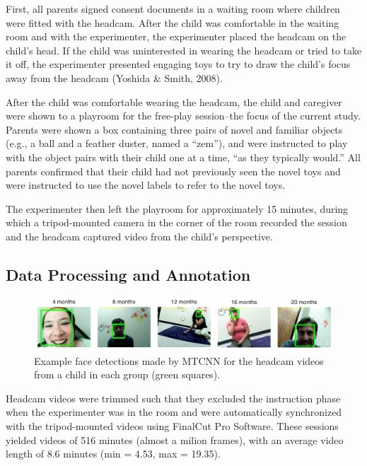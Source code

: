 \documentclass[10pt, letterpaper]{article}
\begin{document}
First, all parents signed consent documents in a waiting room where
children were fitted with the headcam. After the child was comfortable
in the waiting room and with the experimenter, the experimenter placed
the headcam on the child's head. If the child was uninterested in
wearing the headcam or tried to take it off, the experimenter presented
engaging toys to try to draw the child's focus away from the headcam
(Yoshida \& Smith, 2008).

After the child was comfortable wearing the headcam, the child and
caregiver were shown to a playroom for the free-play session--the focus
of the current study. Parents were shown a box containing three pairs of
novel and familiar objects (e.g., a ball and a feather duster, named a
``zem''), and were instructed to play with the object pairs with their
child one at a time, ``as they typically would.'' All parents confirmed
that their child had not previously seen the novel toys and were
instructed to use the novel labels to refer to the novel toys.

The experimenter then left the playroom for approximately 15 minutes,
during which a tripod-mounted camera in the corner of the room recorded
the session and the headcam captured video from the child's perspective.

\subsection{Data Processing and
Annotation}\label{data-processing-and-annotation}

\begin{figure}
\includegraphics[width=6in]{images/framesample.pdf}
\caption{\label{fig:frames} Example face detections made by MTCNN for the headcam videos from a child in each group  (green squares).}
\end{figure}

Headcam videos were trimmed such that they excluded the instruction
phase when the experimenter was in the room and were automatically
synchronized with the tripod-mounted videos using FinalCut Pro Software.
These sessions yielded videos of 516 minutes (almost a milion frames),
with an average video length of 8.6 minutes (min = 4.53, max = 19.35).
\end{document}
